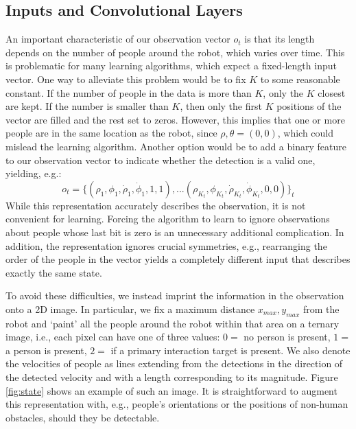 \documentclass[letterpaper, 10 pt, conference]{ieeeconf}
\begin{document}
\subsection{Inputs and Convolutional Layers \label{subsec:meth_inp}}
%
An important characteristic of our observation vector $o_t$ is that its length depends on
 the number of people around the robot, which varies over time.  This is problematic for many
learning algorithms, which expect a fixed-length input vector. One way to alleviate this problem would be to fix $K$ to some reasonable constant. If the number of people in the data is more than $K$, only the $K$ closest are kept. If the number is smaller than $K$, then only the first $K$ positions of the vector are filled and the rest set to zeros. However, this implies that one or more people are in the same location as the robot, since $\rho,\theta = (0,0)$, which could mislead the learning algorithm.  Another option would be to add a binary feature to our observation vector to indicate whether the detection is a valid one, yielding, e.g.:
\begin{equation}
 	o_t = \{(\rho_1,\phi_1,\dot{\rho}_1,\dot{\phi}_1,1,1),... (\rho_{K_t},\phi_{K_t},\dot{\rho}_{K_t},\dot{\phi}_{K_t},0,0)\}_t
\end{equation}
While this representation accurately describes the observation, it is not convenient for learning.  Forcing the algorithm to learn to ignore observations about people whose last bit is zero is an unnecessary additional complication.  In addition, the representation ignores crucial symmetries, e.g., rearranging the order of the people in the vector yields a completely different input that describes exactly the same state.

To avoid these difficulties, we instead imprint the information in the observation onto a 2D image. In particular, we fix a maximum distance $x_{max},y_{max}$ from the robot and `paint' all the people around the robot within that area on a ternary image, i.e., each pixel can have one of three values: $0=$ no person is present, $1=$ a person is present, $2=$ if a primary interaction target is present. We also denote the velocities of people as lines extending from the detections in the direction of the detected velocity and with a length corresponding to its magnitude. Figure \ref{fig:state} shows an example of such an image.  It is straightforward to augment this representation with, e.g., people's orientations or the positions of non-human obstacles, should they be detectable.
\end{document}
